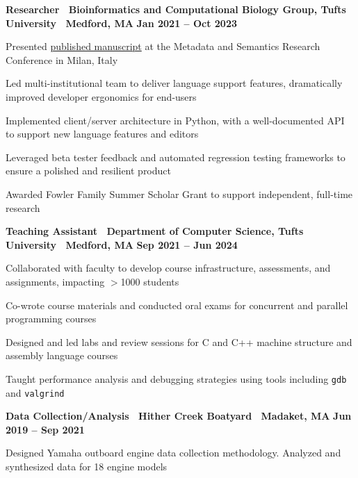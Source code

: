 \documentclass[10pt]{article}
\newenvironment{mylist}[1][]
{\itemize[nosep, wide=0pt, leftmargin=*, after=\strut]}
{\enditemize}
\begin{document}
\begin{minipage}[t]{\linewidth}
    \textbf{Researcher \textbar \ Bioinformatics and Computational Biology Group, Tufts University \textbar \ Medford, MA} \hfill \textbf{Jan 2021 -- Oct 2023}
    \begin{mylist}
        \item Presented \href{https://link.springer.com/chapter/10.1007/978-3-031-65990-4_25}{published manuscript} at the Metadata and Semantics Research Conference in Milan, Italy
        \item Led multi-institutional team to deliver language support features, dramatically improved developer ergonomics for end-users
        \item Implemented client/server architecture in Python, with a well-documented API to support new language features and editors
        \item Leveraged beta tester feedback and automated regression testing frameworks to ensure a polished and resilient product
        \item Awarded Fowler Family Summer Scholar Grant to support independent, full-time research
    \end{mylist}
\end{minipage}

\begin{minipage}[t]{\linewidth}
    \textbf{Teaching Assistant \textbar \ Department of Computer Science, Tufts University \textbar \ Medford, MA} \hfill \textbf{Sep 2021 -- Jun 2024}
    \begin{mylist} 
        \item Collaborated with faculty to develop course infrastructure, assessments, and assignments, impacting $>$1000 students
        \item Co-wrote course materials and conducted oral exams for concurrent and parallel programming courses
        \item Designed and led labs and review sessions for C and C++ machine structure and assembly language courses
        \item Taught performance analysis and debugging strategies using tools including \texttt{gdb} and \texttt{valgrind}
    \end{mylist}
\end{minipage}

\begin{minipage}[t]{\linewidth}
    \textbf{Data Collection/Analysis \textbar \ Hither Creek Boatyard \textbar \ Madaket, MA} \hfill \textbf{Jun 2019 -- Sep 2021}
    \begin{mylist}
        \item Designed Yamaha outboard engine data collection methodology. Analyzed and synthesized data for 18 engine models
    \end{mylist}
\end{minipage}
\end{document}
